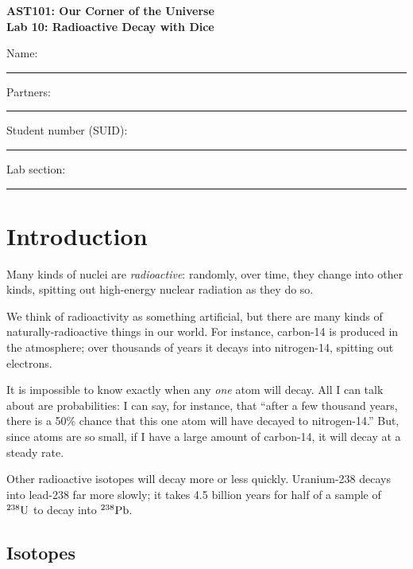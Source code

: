 \documentclass[11pt]{article}
\begin{document}
\begin{center}
\textbf{\Large
AST101: Our Corner of the Universe \\
\vspace*{0.1cm}
Lab 10: Radioactive Decay with Dice 
}
\end{center}

\vspace*{0.5cm}

{\Large Name:}\vspace*{0.5cm}\\\hrule
{\Large Partners:}\vspace*{0.5cm}\\\hrule
{\Large Student number (SUID):}\vspace*{0.5cm}\\\hrule
{\Large Lab section:}\vspace*{0.5cm}\\\hrule
\vspace*{0.5cm}

\section{Introduction}

Many kinds of nuclei are {\it radioactive}: randomly, over time, they change into other kinds, spitting out high-energy nuclear radiation as they do so.

We think of radioactivity as something artificial, but there are many kinds of naturally-radioactive things in our world. For instance, carbon-14 is produced in the atmosphere; over thousands of years it decays into nitrogen-14, spitting out electrons.

It is impossible to know exactly when any {\it one} atom will decay. All I can talk about are probabilities: I can say, for instance, that ``after a few thousand years, there is a 50\% chance that this one atom will have decayed to nitrogen-14.'' 
But, since atoms are so small, if I have a large amount of carbon-14, it will decay at a steady rate.

Other radioactive isotopes will decay more or less quickly. Uranium-238 decays into lead-238 far more slowly; it takes 4.5 billion years for half of a sample of ${}^{238}\rm U$ to decay into ${}^{238}\rm Pb$. 

\subsection{Isotopes}
\end{document}
